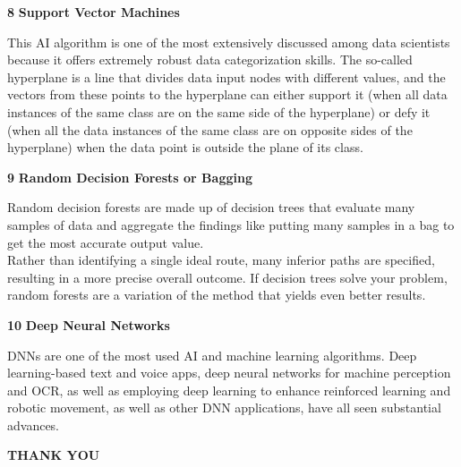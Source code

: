 \documentclass[12pt]{article}
\begin{document}
\textbf{8} \textbf{Support Vector Machines}
\begin{center}
\begin{flushleft}
This AI algorithm is one of the most extensively discussed among data scientists because it offers extremely robust data categorization skills. The so-called hyperplane is a line that divides data input nodes with different values, and the vectors from these points to the hyperplane can either support it (when all data instances of the same class are on the same side of the hyperplane) or defy it (when all the data instances of the same class are on opposite sides of the hyperplane) when the data point is outside the plane of its class.
\end{flushleft}
\end{center}
\textbf{9} \textbf{Random Decision Forests or Bagging}
\begin{center}
\begin{flushleft}
Random decision forests are made up of decision trees that evaluate many samples of data and aggregate the findings like putting many samples in a bag to get the most accurate output value.\\
Rather than identifying a single ideal route, many inferior paths are specified, resulting in a more precise overall outcome. If decision trees solve your problem, random forests are a variation of the method that yields even better results.
\end{flushleft}
\end{center}
\textbf{10} \textbf{Deep Neural Networks}
\begin{center}
\begin{flushleft}
DNNs are one of the most used AI and machine learning algorithms. Deep learning-based text and voice apps, deep neural networks for machine perception and OCR, as well as employing deep learning to enhance reinforced learning and robotic movement, as well as other DNN applications, have all seen substantial advances.
\end{flushleft}
\end{center}
\begin{center}
\textbf{THANK YOU}
\end{center}
\end{document}
